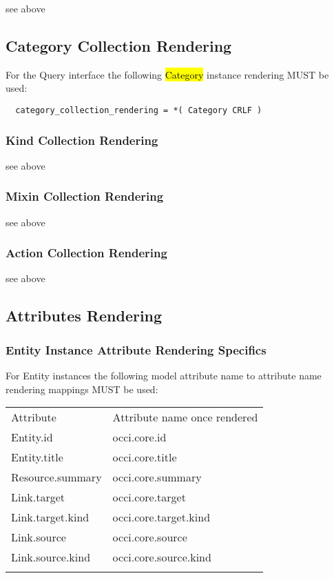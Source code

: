\documentclass[10pt,a4paper]{article}
\begin{document}
see above

\subsection{Category Collection Rendering}

For the Query interface the following \hl{Category} instance rendering MUST be used:

\begin{verbatim}
  category_collection_rendering = *( Category CRLF )
\end{verbatim}

\subsubsection{Kind Collection Rendering}

see above

\subsubsection{Mixin Collection Rendering}

see above

\subsubsection{Action Collection Rendering}

see above

\subsection{Attributes Rendering}

\subsubsection{Entity Instance Attribute Rendering Specifics}

For Entity instances the following model attribute name to attribute name rendering mappings MUST be used:

 {
  \begin{tabular}{ll}
    \toprule
      Attribute         & Attribute name once rendered \\
    \colrule
      Entity.id         & occi.core.id \\
      Entity.title      & occi.core.title \\
      Resource.summary  & occi.core.summary \\
      Link.target       & occi.core.target \\
      Link.target.kind  & occi.core.target.kind \\
      Link.source       & occi.core.source \\
      Link.source.kind  & occi.core.source.kind \\
    \botrule
  \end{tabular}
}
\end{document}
